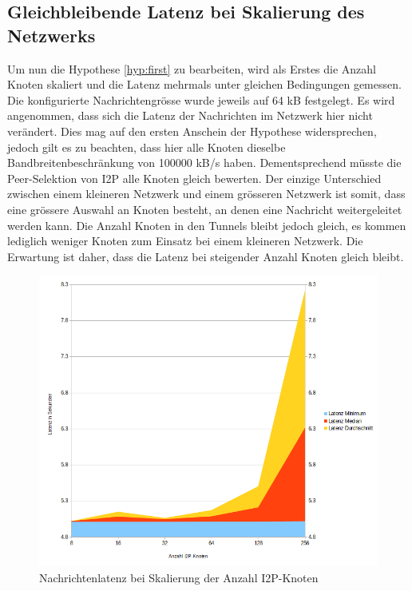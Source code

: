 \subsection{Gleichbleibende Latenz bei Skalierung des Netzwerks}\label{sec:messung_latenz}

Um nun die Hypothese \ref{hyp:first} zu bearbeiten, wird als Erstes die Anzahl Knoten skaliert
und die Latenz mehrmals unter gleichen Bedingungen gemessen.
Die konfigurierte Nachrichtengrösse wurde jeweils auf 64 kB festgelegt.
Es wird angenommen, dass sich die Latenz der Nachrichten im Netzwerk hier nicht verändert.
Dies mag auf den ersten Anschein der Hypothese widersprechen, jedoch gilt es zu beachten, dass hier alle Knoten dieselbe Bandbreitenbeschränkung von 100000 kB/s haben.
Dementsprechend müsste die Peer-Selektion von I2P alle Knoten gleich bewerten.
Der einzige Unterschied zwischen einem kleineren Netzwerk und einem grösseren Netzwerk ist somit,
dass eine grössere Auswahl an Knoten besteht, an denen eine Nachricht weitergeleitet werden kann.
Die Anzahl Knoten in den Tunnels bleibt jedoch gleich, es kommen lediglich weniger Knoten zum Einsatz bei einem kleineren Netzwerk.
Die Erwartung ist daher, dass die Latenz bei steigender Anzahl Knoten gleich bleibt.

\begin{figure}[htp]
  \includegraphics[width=1.1\textwidth]{img/auswertung-latenz.png}
  \caption{Nachrichtenlatenz bei Skalierung der Anzahl I2P-Knoten}\label{fig:auswertung-latenz}
\end{figure}



